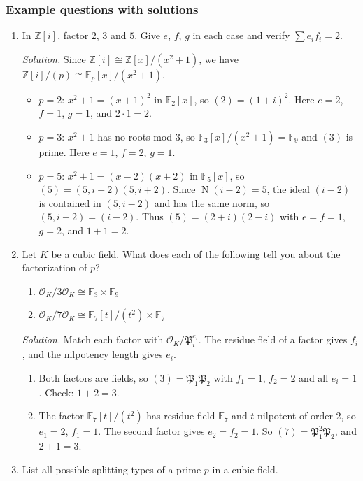 \documentclass[11pt]{article}
\newcommand{\Z}{\mathbb{Z}}
\newcommand{\F}{\mathbb{F}}
\newcommand{\OK}{\mathcal{O}_K}
\newcommand{\fP}{\mathfrak{P}}
\DeclareMathOperator{\Nm}{N}
\begin{document}
\subsubsection*{Example questions with solutions}
\begin{enumerate}[label=\textbf{Q4.\arabic*}]
  \item In $\Z[i]$, factor $2$, $3$ and $5$. Give $e$, $f$, $g$ in each case and verify $\sum e_if_i=2$.

  \textit{Solution.} Since $\Z[i]\cong\Z[x]/(x^2+1)$, we have $\Z[i]/(p)\cong\F_p[x]/(x^2+1)$.
  \begin{itemize}
    \item $p=2$: $x^2+1=(x+1)^2$ in $\F_2[x]$, so $(2)=(1+i)^2$. Here $e=2$, $f=1$, $g=1$, and $2\cdot1=2$.
    \item $p=3$: $x^2+1$ has no roots mod 3, so $\F_3[x]/(x^2+1)=\F_9$ and $(3)$ is prime. Here $e=1$, $f=2$, $g=1$.
    \item $p=5$: $x^2+1=(x-2)(x+2)$ in $\F_5[x]$, so $(5)=(5,i-2)(5,i+2)$. Since $\Nm(i-2)=5$, the ideal $(i-2)$ is contained in $(5,i-2)$ and has the same norm, so $(5,i-2)=(i-2)$. Thus $(5)=(2+i)(2-i)$ with $e=f=1$, $g=2$, and $1+1=2$.
  \end{itemize}

  \item Let $K$ be a cubic field. What does each of the following tell you about the factorization of $p$?
  \begin{enumerate}[label=(\alph*)]
    \item $\OK/3\OK\cong\F_3\times\F_9$
    \item $\OK/7\OK\cong\F_7[t]/(t^2)\times\F_7$
  \end{enumerate}

  \textit{Solution.} Match each factor with $\OK/\fP_i^{e_i}$. The residue field of a factor gives $f_i$, and the nilpotency length gives $e_i$.
  \begin{enumerate}[label=(\alph*)]
    \item Both factors are fields, so $(3)=\fP_1\fP_2$ with $f_1=1$, $f_2=2$ and all $e_i=1$. Check: $1+2=3$.
    \item The factor $\F_7[t]/(t^2)$ has residue field $\F_7$ and $t$ nilpotent of order 2, so $e_1=2$, $f_1=1$. The second factor gives $e_2=f_2=1$. So $(7)=\fP_1^2\fP_2$, and $2+1=3$.
  \end{enumerate}

  \item List all possible splitting types of a prime $p$ in a cubic field.


\end{enumerate}
\end{document}
